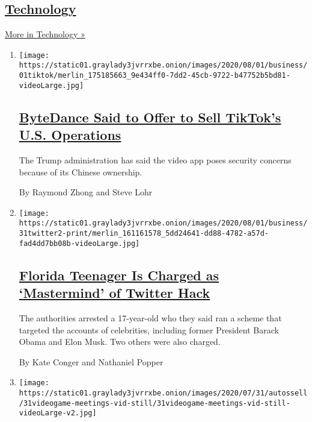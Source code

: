 \hypertarget{technology-1}{%
\subsection{\texorpdfstring{\href{/section/technology}{Technology}}{Technology}}\label{technology-1}}

\href{/section/technology}{More in Technology »}

\begin{enumerate}
\def\labelenumi{\arabic{enumi}.}
\item
  \texttt{[image: https://static01.graylady3jvrrxbe.onion/images/2020/08/01/business/01tiktok/merlin\_175185663\_9e434ff0-7dd2-45cb-9722-b47752b5bd81-videoLarge.jpg]}

  \hypertarget{bytedance-said-to-offer-to-sell-tiktoks-us-operations}{%
  \subsection{\texorpdfstring{\href{/2020/08/01/technology/tiktok-sale-trump-ban.html}{ByteDance
  Said to Offer to Sell TikTok's U.S.
  Operations}}{ByteDance Said to Offer to Sell TikTok's U.S. Operations}}\label{bytedance-said-to-offer-to-sell-tiktoks-us-operations}}

  The Trump administration has said the video app poses security
  concerns because of its Chinese ownership.

  By Raymond Zhong and Steve Lohr
\item
  \texttt{[image: https://static01.graylady3jvrrxbe.onion/images/2020/08/01/business/31twitter2-print/merlin\_161161578\_5dd24641-dd88-4782-a57d-fad4dd7bb08b-videoLarge.jpg]}

  \hypertarget{florida-teenager-is-charged-as-mastermind-of-twitter-hack}{%
  \subsection{\texorpdfstring{\href{/2020/07/31/technology/twitter-hack-arrest.html}{Florida
  Teenager Is Charged as `Mastermind' of Twitter
  Hack}}{Florida Teenager Is Charged as `Mastermind' of Twitter Hack}}\label{florida-teenager-is-charged-as-mastermind-of-twitter-hack}}

  The authorities arrested a 17-year-old who they said ran a scheme that
  targeted the accounts of celebrities, including former President
  Barack Obama and Elon Musk. Two others were also charged.

  By Kate Conger and Nathaniel Popper
\item
  \texttt{[image: https://static01.graylady3jvrrxbe.onion/images/2020/07/31/autossell/31videogame-meetings-vid-still/31videogame-meetings-vid-still-videoLarge-v2.jpg]}


\end{enumerate}
